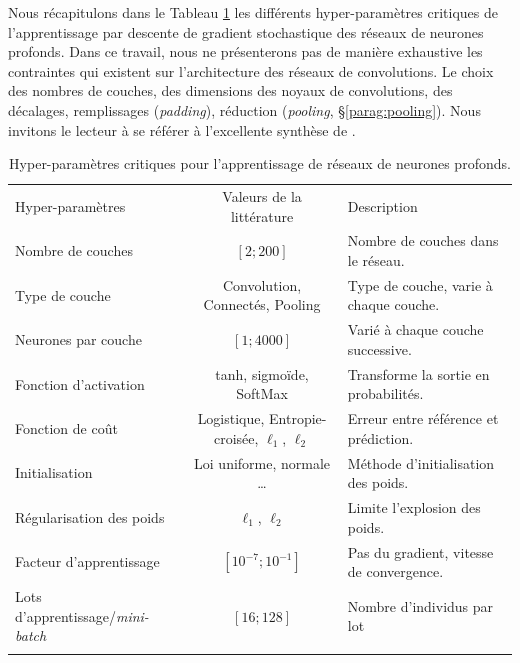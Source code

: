 Nous récapitulons dans le Tableau \ref{tab:cnn_hyperparameters} les différents hyper-paramètres critiques de l'apprentissage par descente de gradient stochastique des réseaux de neurones profonds. Dans ce travail, nous ne présenterons pas de manière exhaustive les contraintes qui existent sur l'architecture des réseaux de convolutions. Le choix des nombres de couches, des dimensions des noyaux de convolutions, des décalages, remplissages (\textit{padding}), réduction (\textit{pooling}, §\ref{parag:pooling}). Nous invitons le lecteur à se référer à l'excellente synthèse de \citeauthor{dumoulin_guide_2016} \cite{dumoulin_guide_2016}.

\begin{table}[ht]
	\centering
	\hspace*{-8mm}
	\begin{tabular}{|l|c|l|}
		\hhline{---}
		Hyper-paramètres         & Valeurs de la littérature         & Description  \\
		\hhline{=:=:=} %
		Nombre de couches        & $[2 ; 200]$                       & Nombre de couches dans le réseau.  \\ \hline
		Type de couche           & Convolution, Connectés, Pooling & Type de couche, varie à chaque couche.  \\ \hline
		Neurones par couche      & $[1 ; 4000]$                      & Varié à chaque couche successive.  \\ \hline
		Fonction d'activation    & tanh, sigmoïde, SoftMax           & Transforme la sortie en probabilités.  \\ \hline
		Fonction de coût         & Logistique, Entropie-croisée, $\ell_{1}$, $\ell_{2}$ & Erreur entre  référence et prédiction. \\ \hline
		Initialisation           & Loi uniforme, normale …           & Méthode d’initialisation des poids.  \\ \hline
		Régularisation des poids & $\ell_{1}$, $\ell_{2}$                            & Limite l’explosion des poids.  \\ \hline
		Facteur d’apprentissage  & $[10^{-7} ; 10^{-1}]$             & Pas du gradient, vitesse de convergence.  \\ \hline
		Lots d'apprentissage/\textit{mini-batch}  & $[16 ; 128]$                      & Nombre d'individus par lot  \\
		\hhline{---}
	\end{tabular}
	\caption{Hyper-paramètres critiques pour l'apprentissage de réseaux de neurones profonds.}
	\label{tab:cnn_hyperparameters}
\end{table}

